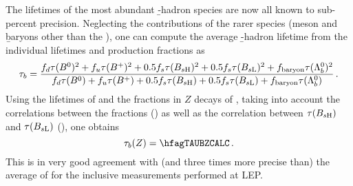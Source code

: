 The lifetimes of the most abundant \b-hadron species are now all known to sub-percent precision. Neglecting the 
contributions of the rarer species (\Bc meson and \b baryons other than the \Lb), one can compute the average 
\b-hadron lifetime from the individual lifetimes and production fractions as 
\begin{equation}
\tau_b = \frac%
{\fBd \tau(\Bd)^2+ \fBu \tau(\Bu)^2+0.5 \fBs \tau(B_{s\rm H})^2+0.5 \fBs \tau(B_{s\rm L})^2+ \fbb \tau(\Lb)^2}%
{\fBd \tau(\Bd)  + \fBu \tau(\Bu)  +0.5 \fBs \tau(B_{s\rm H})  +0.5 \fBs \tau(B_{s\rm L})  + \fbb \tau(\Lb)  } \,.
\end{equation}
Using the lifetimes of  and the fractions in $Z$ decays of ,
taking into account the correlations between the fractions () as well as the correlation 
between $\tau(B_{s\rm H})$ and $\tau(B_{s\rm L})$ (\hfagZRHOTAUHTAUL), one obtains
\begin{equation}
\tau_b(Z) = \hfagTAUBZCALC \,.
\end{equation}
This is in very good agreement with (and three times more precise than)
the average of  for the inclusive measurements performed at LEP. 
